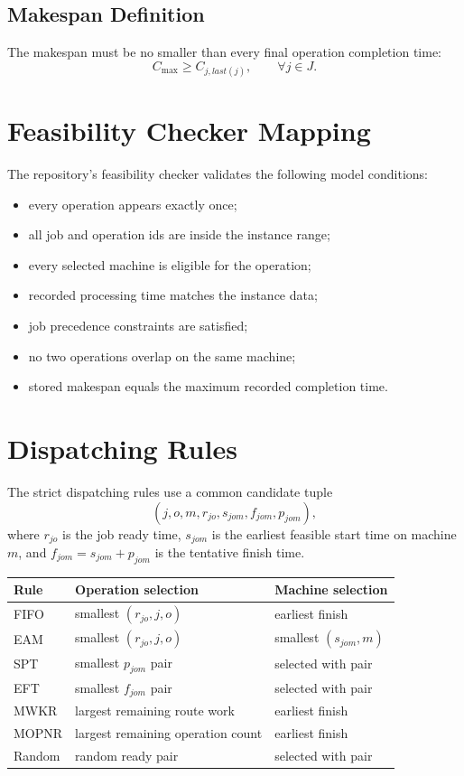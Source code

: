 ﻿\documentclass[11pt]{article}
\begin{document}
\subsection{Makespan Definition}

The makespan must be no smaller than every final operation completion time:
\[
C_{\max} \ge C_{j,last(j)}, \qquad \forall j \in J.
\]

\section{Feasibility Checker Mapping}

The repository's feasibility checker validates the following model conditions:

\begin{itemize}
  \item every operation appears exactly once;
  \item all job and operation ids are inside the instance range;
  \item every selected machine is eligible for the operation;
  \item recorded processing time matches the instance data;
  \item job precedence constraints are satisfied;
  \item no two operations overlap on the same machine;
  \item stored makespan equals the maximum recorded completion time.
\end{itemize}

\section{Dispatching Rules}

The strict dispatching rules use a common candidate tuple
\[
(j,o,m,r_{jo},s_{jom},f_{jom},p_{jom}),
\]
where $r_{jo}$ is the job ready time, $s_{jom}$ is the earliest feasible start
time on machine $m$, and $f_{jom}=s_{jom}+p_{jom}$ is the tentative finish time.

\begin{table}[h]
\centering
\begin{tabular}{lll}
\toprule
Rule & Operation selection & Machine selection \\
\midrule
FIFO & smallest $(r_{jo},j,o)$ & earliest finish \\
EAM & smallest $(r_{jo},j,o)$ & smallest $(s_{jom},m)$ \\
SPT & smallest $p_{jom}$ pair & selected with pair \\
EFT & smallest $f_{jom}$ pair & selected with pair \\
MWKR & largest remaining route work & earliest finish \\
MOPNR & largest remaining operation count & earliest finish \\
Random & random ready pair & selected with pair \\
\bottomrule
\end{tabular}
\end{table}
\end{document}
